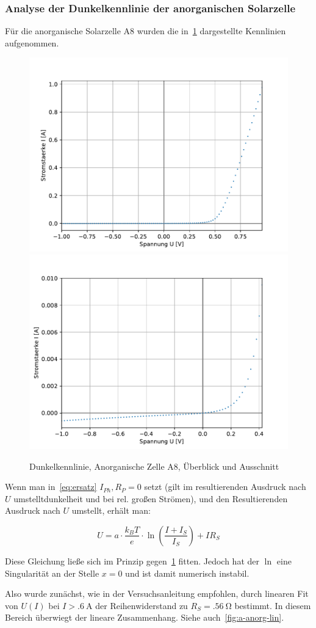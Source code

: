 \documentclass[slug=SZ, room=Hermann-Krone-Bau\,\ Labor\ 1.25, supervisor=Martin\ Kroll]{../../Lab_Report_LaTeX/lab_report}
\begin{document}
\subsubsection{Analyse der Dunkelkennlinie der anorganischen
  Solarzelle}
\label{sec:anordunkel}

F\"ur die anorganische Solarzelle A8 wurden die
in~\ref{fig:a-anorg-dunkel} dargestellte Kennlinien aufgenommen.
\begin{figure}[H]\centering
  \includegraphics[width=.5\columnwidth]{./figs/python/A/an_dark_all.pdf}
  \includegraphics[width=.5\columnwidth]{./figs/python/A/an_dark_close.pdf}
  \caption{Dunkelkennlinie, Anorganische Zelle A8, \"Uberblick und Ausschnitt}
  \label{fig:a-anorg-dunkel}
\end{figure}

Wenn man in~\ref{eq:ersatz} \(I_{Ph}, R_{P}=0\) setzt (gilt im
resultierenden Ausdruck nach \(U\) umstelltdunkelheit und bei
rel. gro\ss{}en Str\"omen), und den Resultierenden Ausdruck nach \(U\)
umstellt, erh\"alt man:

\begin{equation}
  \label{eq:uofi}
  U=a\cdot\frac{k_BT}{e}\cdot\ln(\frac{I+I_S}{I_S})+IR_S
\end{equation}


Diese Gleichung ließe sich im Prinzip gegen~\ref{fig:a-anorg-dunkel}
fitten. Jedoch hat der \(\ln\) eine Singularit\"at an der Stelle
\(x=0\) und ist damit numerisch instabil.

Also wurde zun\"achst, wie in der Versuchsanleitung empfohlen, durch
linearen Fit von \(U(I)\) bei \(I>\SI{.6}{\ampere}\) der
Reihenwiderstand zu \(R_S=\SI{.56}{\ohm}\) bestimmt. In diesem Bereich
\"uberwiegt der lineare Zusammenhang. Siehe
auch~\ref{fig:a-anorg-lin}.
\end{document}
